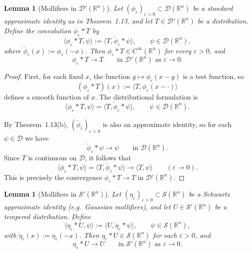 \documentclass[12pt,a4paper]{article}
\theoremstyle{plain}
\newtheorem{lemma}[theorem]{Lemma}
\theoremstyle{definition}
\theoremstyle{remark}
\theoremstyle{remark}
\begin{document}
\begin{lemma}[Mollifiers in $\mathcal{D}'(\mathbb{R}^n)$]
	Let $(\phi_\varepsilon)_{\varepsilon>0}\subset \mathcal{D}(\mathbb{R}^n)$
	be a standard approximate identity as in Theorem~1.13, and let
	$T\in\mathcal{D}'(\mathbb{R}^n)$ be a distribution. Define the
	convolution $\phi_\varepsilon * T$ by
	\[
	\langle \phi_\varepsilon * T, \psi\rangle
	:= \big\langle T, \check{\phi}_\varepsilon * \psi \big\rangle,
	\qquad \psi\in\mathcal{D}(\mathbb{R}^n),
	\]
	where $\check{\phi}_\varepsilon(x):=\phi_\varepsilon(-x)$. Then
	$\phi_\varepsilon * T \in C^\infty(\mathbb{R}^n)$ for every
	$\varepsilon>0$, and
	\[
	\phi_\varepsilon * T \longrightarrow T
	\qquad\text{in }\mathcal{D}'(\mathbb{R}^n)\text{ as }\varepsilon\to0.
	\]
\end{lemma}

\begin{proof}
	First, for each fixed $x$, the function
	$y\mapsto \phi_\varepsilon(x-y)$ is a test function, so
	\[
	(\phi_\varepsilon * T)(x)
	:= \big\langle T, \phi_\varepsilon(x-\cdot) \big\rangle
	\]
	defines a smooth function of $x$.  The distributional formulation is
	\[
	\langle \phi_\varepsilon * T, \psi\rangle
	= \big\langle T, \check{\phi}_\varepsilon * \psi \big\rangle,
	\qquad \psi\in\mathcal{D}(\mathbb{R}^n).
	\]
	
	By Theorem~1.13(b), $(\check{\phi}_\varepsilon)_{\varepsilon>0}$ is
	also an approximate identity, so for each $\psi\in\mathcal{D}$ we have
	\[
	\check{\phi}_\varepsilon * \psi \longrightarrow \psi
	\qquad\text{in }\mathcal{D}(\mathbb{R}^n).
	\]
	Since $T$ is continuous on $\mathcal{D}$, it follows that
	\[
	\langle \phi_\varepsilon * T, \psi\rangle
	= \big\langle T, \check{\phi}_\varepsilon * \psi \big\rangle
	\longrightarrow \langle T,\psi\rangle
	\qquad (\varepsilon\to0).
	\]
	This is precisely the convergence $\phi_\varepsilon * T\to T$ in
	$\mathcal{D}'(\mathbb{R}^n)$.
\end{proof}

\medskip

\begin{lemma}[Mollifiers in $\mathcal{S}'(\mathbb{R}^n)$]
	Let $(\eta_\varepsilon)_{\varepsilon>0}\subset\mathcal{S}(\mathbb{R}^n)$
	be a Schwartz approximate identity (e.g.\ Gaussian mollifiers), and let
	$U\in\mathcal{S}'(\mathbb{R}^n)$ be a tempered distribution. Define
	\[
	\langle \eta_\varepsilon * U, \psi\rangle
	:= \big\langle U, \check{\eta}_\varepsilon * \psi \big\rangle,
	\qquad \psi\in\mathcal{S}(\mathbb{R}^n),
	\]
	with $\check{\eta}_\varepsilon(x):=\eta_\varepsilon(-x)$. Then
	$\eta_\varepsilon * U\in\mathcal{S}(\mathbb{R}^n)$ for each
	$\varepsilon>0$, and
	\[
	\eta_\varepsilon * U \longrightarrow U
	\qquad\text{in }\mathcal{S}'(\mathbb{R}^n)\text{ as }\varepsilon\to0.
	\]
\end{lemma}
\end{document}
